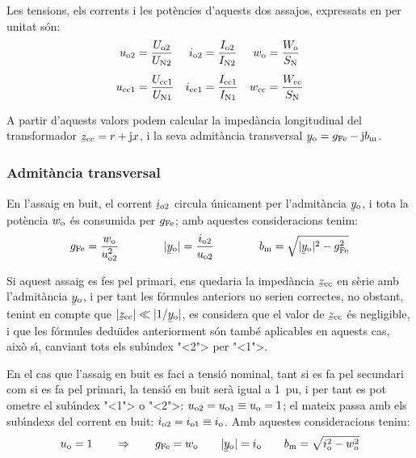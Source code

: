 Les tensions, els corrents i les pot\`{e}ncies d'aquests dos  assajos,
expressats en per unitat s\'{o}n:
\begin{align}
    u_\mathrm{o2} &=\frac{U_\mathrm{o2}}{U_\mathrm{N2}} &
    i_\mathrm{o2} &=\frac{I_\mathrm{o2}}{I_\mathrm{N2}} &
    w_\mathrm{o}  &=\frac{W_\mathrm{o}}{S_\mathrm{N}} \\[1ex]
    u_\mathrm{cc1} &=\frac{U_\mathrm{cc1}}{U_\mathrm{N1}} &
    i_\mathrm{cc1} &=\frac{I_\mathrm{cc1}}{I_\mathrm{N1}} &
    w_\mathrm{cc} &=\frac{W_\mathrm{cc}}{S_\mathrm{N}}
\end{align}

A partir d'aquests valors podem calcular la imped\`{a}ncia longitudinal
del transformador $\cmplx{z}\ped{cc}=r+\ju x$, i la seva admit\`{a}ncia
transversal $\cmplx{y}\ped{o}=g\ped{Fe}-\ju b\ped{m}$.

\subsubsection{Admit\`{a}ncia transversal}

En l'assaig en buit, el corrent $\cmplx{i}\ped{o2}$ circula
\'{u}nicament per l'admit\`{a}ncia $\cmplx{y}\ped{o}$, i tota la pot\`{e}ncia
$w_\mathrm{o}$ \'{e}s consumida per $g_\mathrm{Fe}$; amb aquestes consideracions
tenim:
\begin{equation}
    g\ped{Fe} = \frac{w\ped{o}}{u\ped{o2}^2} \qquad\qquad
    |\cmplx{y}\ped{o}| = \frac{i\ped{o2}}{u\ped{o2}}
    \qquad\qquad
    b\ped{m} = \sqrt{|\cmplx{y}\ped{o}|^2 - g\ped{Fe}^2}
\end{equation}

Si aquest assaig es fes pel primari, ens quedaria la imped\`{a}ncia
$\cmplx{z}\ped{cc}$ en s\`{e}rie amb l'admit\`{a}ncia $\cmplx{y}\ped{o}$, i
per tant les f\'{o}rmules anteriors no serien correctes, no obstant,
tenint en compte que $|\cmplx{z}\ped{cc}| \ll |1/\cmplx{y}\ped{o}|$,
es  considera que el valor de $\cmplx{z}\ped{cc}$ \'{e}s negligible, i
que les f\'{o}rmules dedu\"{\i}des anteriorment s\'{o}n tamb\'{e} aplicables en
aquests cas, aix\`{o} s\'{\i}, canviant tots els sub\'{\i}ndex {"<}2{">} per {"<}1{">}.

En el cas que l'assaig en buit es faci a tensi\'{o} nominal, tant  si es
fa pel secundari com si es fa pel primari, la tensi\'{o} en buit ser\`{a}
igual a \SI{1}{pu}, i per tant es pot ometre el sub\'{\i}ndex {"<}1{">} o {"<}2{">}:
$u_\mathrm{o2} = u_\mathrm{o1} \equiv u_\mathrm{o} = 1$; el mateix passa amb els
sub\'{\i}ndexs del corrent en buit: $i_\mathrm{o2} = i_\mathrm{o1} \equiv
i_\mathrm{o}$. Amb aquestes consideracions tenim:
\begin{equation}
    u\ped{o} = 1 \qquad \Rightarrow \qquad g\ped{Fe} = w\ped{o} \qquad
    |\cmplx{y}\ped{o}| = i\ped{o} \qquad
    b\ped{m} = \sqrt{i\ped{o}^2 - w\ped{o}^2}
    \label{eq:assaig-buit-nomianl}
\end{equation}

